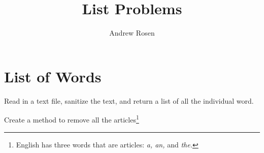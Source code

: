 \documentclass[10pt,letterpaper]{article}
\author{Andrew Rosen}
\title{List Problems}
\date{}
\begin{document}
	
	\maketitle
	
	
	\section{List of Words}
	Read in a text file, sanitize the text, and return a list of all the individual word.
	
	Create a method to remove all the articles\footnote{English has three words that are articles: \textit{a, an,} and \textit{the.}}
	
	
\end{document}
